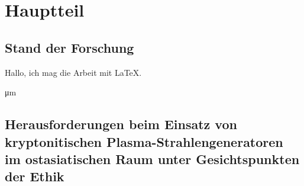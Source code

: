 \chapter{Hauptteil}\label{cha:hauptteil}
\section{Stand der Forschung}


\blindtext[1] Hallo, ich mag die Arbeit mit \LaTeX.

\si{\micro\meter}

\blindtext[1]

\blindtext[1]

\blindtext[1]

\blindtext[2]

\section[Herausforderungen]{Herausforderungen beim Einsatz von kryptonitischen Plasma-Strahlengeneratoren im ostasiatischen Raum unter Gesichtspunkten der Ethik}

\blindtext[5]
